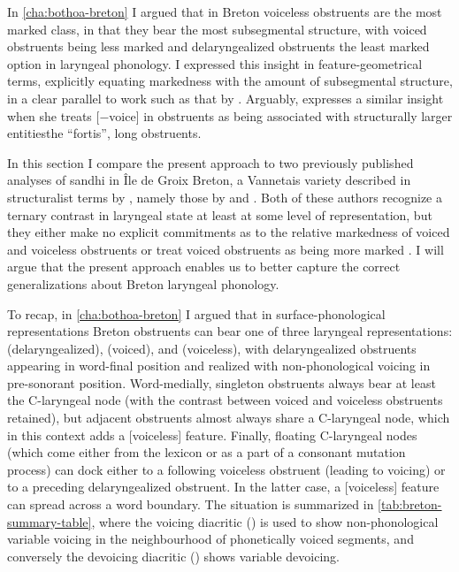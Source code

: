 In \cref{cha:bothoa-breton} I argued that in Breton voiceless obstruents are the most marked class, in that they bear the most subsegmental structure, with voiced obstruents being less marked and delaryngealized obstruents the least marked option in laryngeal phonology. I expressed this insight in feature\hyp geometrical terms, explicitly equating markedness with the amount of subsegmental structure, in a clear parallel to work such as that by \citet{causley99:_compl_optim_theor,rice03:_featur}. Arguably, \citet{carlyle88:_breton} expresses a similar insight when she treats [$-$voice] in obstruents as being associated with structurally larger entities\dash the \enquote{fortis}, \ie long obstruents.

In this section I compare the present approach to two previously published analyses of sandhi in Île de Groix Breton, a Vannetais variety described in structuralist terms by \citet{Ter70}, namely those by \citet{kramer-breton} and \citet{hall09:_laryn_breton}. Both of these authors recognize a ternary contrast in laryngeal state at least at some level of representation, but they either make no explicit commitments as to the relative markedness of voiced and voiceless obstruents \citep{kramer-breton} or treat voiced obstruents as being more marked \citep{hall09:_laryn_breton}. I will argue that the present approach enables us to better capture the correct generalizations about Breton laryngeal phonology.

To recap, in \cref{cha:bothoa-breton} I argued that in surface\hyp phonological representations Breton obstruents can bear one of three laryngeal representations: \featurestring{\rt} (delaryngealized),  (voiced), and  (voiceless), with delaryngealized obstruents appearing in word\hyp final position and realized with non\hyp phonological voicing in pre\hyp sonorant position. Word\hyp medially, singleton obstruents always bear at least the C-laryngeal node (with the contrast between voiced and voiceless obstruents retained), but adjacent obstruents almost always share a C-laryngeal node, which in this context adds a [voiceless] feature. Finally, floating C\hyp laryngeal nodes (which come either from the lexicon or as a part of a consonant mutation process) can dock either to a following voiceless obstruent (leading to voicing) or to a preceding delaryngealized obstruent. In the latter case, a [voiceless] feature can spread across a word boundary. The situation is summarized in \cref{tab:breton-summary-table}, where the voicing diacritic () is used to show non\hyp phonological variable voicing in the neighbourhood of phonetically voiced segments, and conversely the devoicing diacritic () shows variable devoicing.

